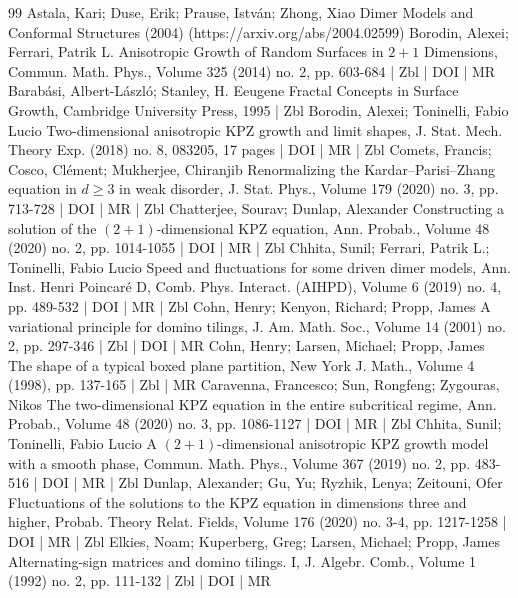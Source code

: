 \begin{thebibliography}{99}
Astala, Kari; Duse, Erik; Prause, István; Zhong, Xiao Dimer Models and Conformal Structures (2004) (https://arxiv.org/abs/2004.02599)
Borodin, Alexei; Ferrari, Patrik L. Anisotropic Growth of Random Surfaces in $2+1$ Dimensions, Commun. Math. Phys., Volume 325 (2014) no. 2, pp. 603-684 | Zbl | DOI | MR
Barabási, Albert-László; Stanley, H. Eeugene Fractal Concepts in Surface Growth, Cambridge University Press, 1995 | Zbl
Borodin, Alexei; Toninelli, Fabio Lucio Two-dimensional anisotropic KPZ growth and limit shapes, J. Stat. Mech. Theory Exp. (2018) no. 8, 083205, 17 pages | DOI | MR | Zbl
Comets, Francis; Cosco, Clément; Mukherjee, Chiranjib Renormalizing the Kardar–Parisi–Zhang equation in $d\ge 3$ in weak disorder, J. Stat. Phys., Volume 179 (2020) no. 3, pp. 713-728 | DOI | MR | Zbl
Chatterjee, Sourav; Dunlap, Alexander Constructing a solution of the $(2+1)$-dimensional KPZ equation, Ann. Probab., Volume 48 (2020) no. 2, pp. 1014-1055 | DOI | MR | Zbl
Chhita, Sunil; Ferrari, Patrik L.; Toninelli, Fabio Lucio Speed and fluctuations for some driven dimer models, Ann. Inst. Henri Poincaré D, Comb. Phys. Interact. (AIHPD), Volume 6 (2019) no. 4, pp. 489-532 | DOI | MR | Zbl
Cohn, Henry; Kenyon, Richard; Propp, James A variational principle for domino tilings, J. Am. Math. Soc., Volume 14 (2001) no. 2, pp. 297-346 | Zbl | DOI | MR
Cohn, Henry; Larsen, Michael; Propp, James The shape of a typical boxed plane partition, New York J. Math., Volume 4 (1998), pp. 137-165 | Zbl | MR
Caravenna, Francesco; Sun, Rongfeng; Zygouras, Nikos The two-dimensional KPZ equation in the entire subcritical regime, Ann. Probab., Volume 48 (2020) no. 3, pp. 1086-1127 | DOI | MR | Zbl
Chhita, Sunil; Toninelli, Fabio Lucio A $(2+1)$-dimensional anisotropic KPZ growth model with a smooth phase, Commun. Math. Phys., Volume 367 (2019) no. 2, pp. 483-516 | DOI | MR | Zbl
Dunlap, Alexander; Gu, Yu; Ryzhik, Lenya; Zeitouni, Ofer Fluctuations of the solutions to the KPZ equation in dimensions three and higher, Probab. Theory Relat. Fields, Volume 176 (2020) no. 3-4, pp. 1217-1258 | DOI | MR | Zbl
Elkies, Noam; Kuperberg, Greg; Larsen, Michael; Propp, James Alternating-sign matrices and domino tilings. I, J. Algebr. Comb., Volume 1 (1992) no. 2, pp. 111-132 | Zbl | DOI | MR

\end{thebibliography}
